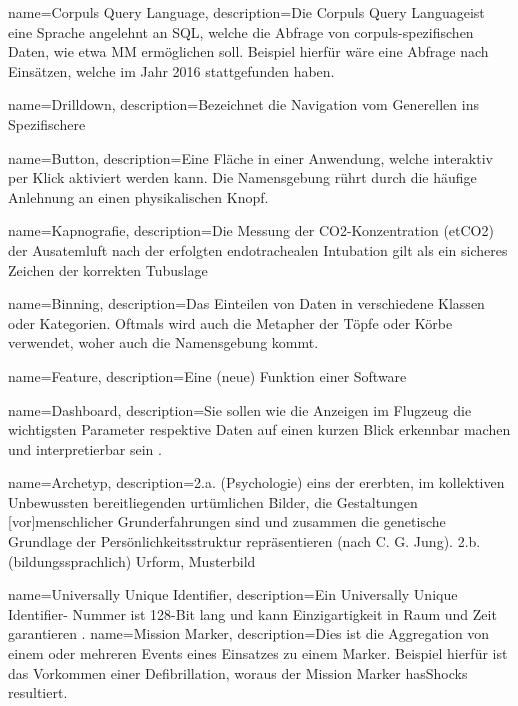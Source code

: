 {
     name=Corpuls Query Language,
     description={Die \glqq Corpuls Query Language\grqq ist eine \glqq Sprache\grqq{} angelehnt an SQL, welche die Abfrage von corpuls-spezifischen Daten, wie etwa \gls{MM} ermöglichen soll. Beispiel hierfür wäre eine Abfrage nach Einsätzen, welche im Jahr 2016 stattgefunden haben.}
}

{
     name=Drilldown,
     description={Bezeichnet die Navigation vom Generellen ins Spezifischere \cite{Walter.2008}}
}


{
     name=Button,
     description={Eine Fläche in einer Anwendung, welche interaktiv per Klick aktiviert werden kann. Die Namensgebung rührt durch die häufige Anlehnung an einen physikalischen Knopf.}
}

{
     name=Kapnografie,
     description={\glqq Die Messung der CO2-Konzentration (etCO2)  der Ausatemluft nach der erfolgten endotrachealen Intubation gilt als ein sicheres Zeichen der korrekten Tubuslage \grqq{} \cite{Wnent.2013} }
}

{
     name=Binning,
     description={Das Einteilen von Daten in verschiedene Klassen oder Kategorien. Oftmals wird auch die Metapher der Töpfe oder Körbe verwendet, woher auch die Namensgebung kommt.}
}

{
     name=Feature,
     description={Eine (neue) Funktion einer Software}
}

{
     name=Dashboard,
     description={Sie sollen wie die Anzeigen im Flugzeug die wichtigsten Parameter respektive Daten auf einen kurzen Blick erkennbar machen und interpretierbar sein \cite[S.18]{Engels.2015}.}
}


{
     name=Archetyp,
     description={\glqq 2.a. (Psychologie) eins der ererbten, im kollektiven Unbewussten bereitliegenden urtümlichen Bilder, die Gestaltungen [vor]menschlicher Grunderfahrungen sind und zusammen die genetische Grundlage der Persönlichkeitsstruktur repräsentieren (nach C. G. Jung).
     2.b. (bildungssprachlich) Urform, Musterbild\grqq \cite{Dudenredaktion.2015}}
}

{
     name=Universally Unique Identifier,
     description={Ein \glqq Universally Unique Identifier\grqq- Nummer ist 128-Bit lang und kann Einzigartigkeit in Raum und Zeit garantieren \cite{Leach.2005}. }
}
{
     name=Mission Marker,
     description={Dies ist die Aggregation von einem oder mehreren Events eines Einsatzes zu einem Marker. Beispiel hierfür ist das Vorkommen einer Defibrillation, woraus der Mission Marker \glqq hasShocks\grqq{} resultiert. }
}

